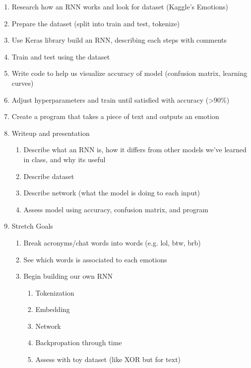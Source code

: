 \documentclass[11pt]{article}
\begin{document}
\begin{enumerate}
    \item Research how an RNN works and look for dataset (Kaggle's Emotions)
    \item Prepare the dataset (split into train and test, tokenize)
    \item Use Keras library build an RNN, describing each steps with comments
    \item Train and test using the dataset
    \item Write code to help us visualize accuracy of model (confusion matrix, learning curves)
    \item Adjust hyperparameters and train until satisfied with accuracy (>90\%)
    \item Create a program that takes a piece of text and outputs an emotion
    \item Writeup and presentation
        \begin{enumerate}
            \item Describe what an RNN is, how it differs from other
            models we've learned in class, and why its useful
            \item Describe dataset
            \item Describe network (what the model is doing to each input)
            \item Assess model using accuracy, confusion matrix, and program
        \end{enumerate}
    \item Stretch Goals
        \begin{enumerate}
            \item Break acronyms/chat words into words (e.g. lol, btw, brb)
            \item See which words is associated to each emotions
            \item Begin building our own RNN
                \begin{enumerate}
                    \item Tokenization
                    \item Embedding
                    \item Network
                    \item Backpropation through time
                    \item Assess with toy dataset (like XOR but for text)
                \end{enumerate}
        \end{enumerate}

\end{enumerate}
\end{document}
